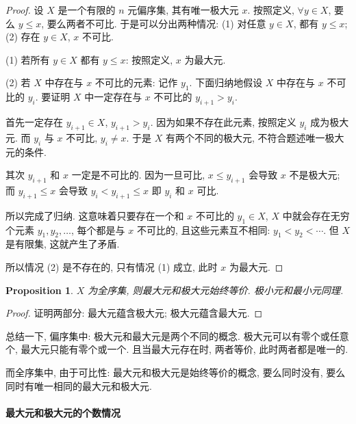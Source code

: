 \documentclass[UTF8]{ctexart}
\theoremstyle{mystyle}
\newtheorem{proposition}{Proposition}[section]
\theoremstyle{myremark}
\theoremstyle{plain}
\begin{document}
\begin{proof}
    设 $ X $ 是一个有限的 $ n $ 元偏序集, 其有唯一极大元 $ x $. 按照定义, $ \forall y \in X $, 要么 $ y \le x $, 要么两者不可比. 于是可以分出两种情况: (1) 对任意 $ y \in X $, 都有 $ y \le x $; (2) 存在 $ y \in X $, $ x $ 不可比.

    (1) 若所有 $ y \in X $ 都有 $ y \le x $: 按照定义, $ x $ 为最大元.

    (2) 若 $ X $ 中存在与 $ x $ 不可比的元素: 记作 $ y_1 $. 下面归纳地假设 $ X $ 中存在与 $ x $ 不可比的 $ y_i $. 要证明 $ X $ 中一定存在与 $ x $ 不可比的 $ y_{i + 1} > y_i $.

    首先一定存在 $ y_{i + 1} \in X $, $ y_{i + 1} > y_i $. 因为如果不存在此元素, 按照定义 $ y_i $ 成为极大元. 而 $ y_i $ 与 $ x $ 不可比, $ y_i \neq x $. 于是 $ X $ 有两个不同的极大元, 不符合题述唯一极大元的条件.

    其次 $ y_{i + 1} $ 和 $ x $ 一定是不可比的. 因为一旦可比, $ x \le y_{i + 1} $ 会导致 $ x $ 不是极大元; 而 $ y_{i + 1} \le x $ 会导致 $ y_i < y_{i + 1} \le x $ 即 $ y_i $ 和 $ x $ 可比.

    所以完成了归纳. 这意味着只要存在一个和 $ x $ 不可比的 $ y_1 \in X $, $ X $ 中就会存在无穷个元素 $ y_1, y_2, \dots $, 每个都是与 $ x $ 不可比的, 且这些元素互不相同: $ y_1 < y_2 < \cdots $. 但 $ X $ 是有限集, 这就产生了矛盾. 
    
    所以情况 (2) 是不存在的, 只有情况 (1) 成立, 此时 $ x $ 为最大元.
\end{proof}

\begin{proposition}
    $ X $ 为全序集, 则最大元和极大元始终等价. 极小元和最小元同理.
\end{proposition}

\begin{proof} 
    证明两部分: 最大元蕴含极大元; 极大元蕴含最大元.


    
\end{proof}

总结一下, 偏序集中: 极大元和最大元是两个不同的概念. 极大元可以有零个或任意个, 最大元只能有零个或一个. 且当最大元存在时, 两者等价, 此时两者都是唯一的.

而全序集中, 由于可比性: 最大元和极大元是始终等价的概念, 要么同时没有, 要么同时有唯一相同的最大元和极大元.

\paragraph{最大元和极大元的个数情况} \ 
\end{document}

